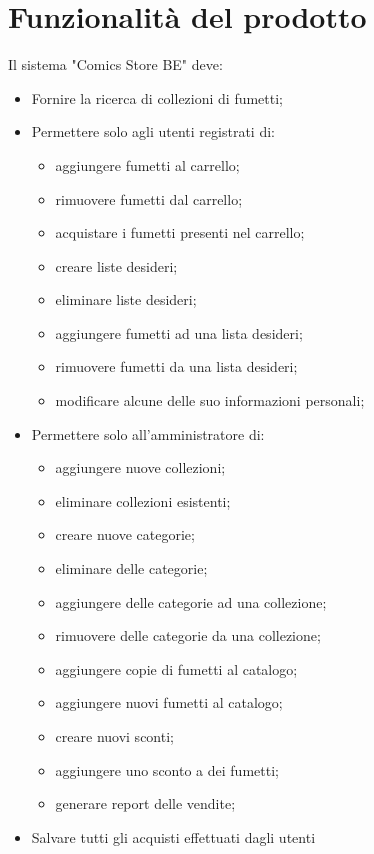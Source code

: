 \documentclass{scrreprt}
\begin{document}
\section{Funzionalità del prodotto}
Il sistema "Comics Store BE" deve:
\begin{itemize}
    \item Fornire la ricerca di collezioni di fumetti;
    \item Permettere solo agli utenti registrati di:
        \begin{itemize}
            \item aggiungere fumetti al carrello;
            \item rimuovere fumetti dal carrello;
            \item acquistare i fumetti presenti nel carrello;
            \item creare liste desideri;
            \item eliminare liste desideri;
            \item aggiungere fumetti ad una lista desideri;
            \item rimuovere fumetti da una lista desideri;
            \item modificare alcune delle suo informazioni personali;
        \end{itemize}
    \item Permettere solo all'amministratore di:
        \begin{itemize}
            \item aggiungere nuove collezioni;
            \item eliminare collezioni esistenti;
            \item creare nuove categorie;
            \item eliminare delle categorie;
            \item aggiungere delle categorie ad una collezione;
            \item rimuovere delle categorie da una collezione;
            \item aggiungere copie di fumetti al catalogo;
            \item aggiungere nuovi fumetti al catalogo;
            \item creare nuovi sconti;
            \item aggiungere uno sconto a dei fumetti;
            \item generare report delle vendite;
        \end{itemize}
    \item Salvare tutti gli acquisti effettuati dagli utenti
\end{itemize}
\end{document}
